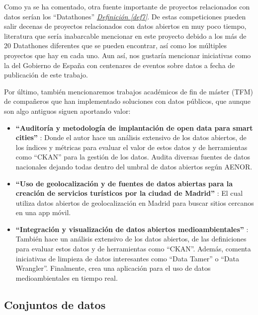 Como ya se ha comentado, otra fuente importante de proyectos relacionados con datos serían los ``Datathones'' \hyperref[def7]{\textit{Definición \ref*{def7}}}. De estas competiciones pueden salir decenas de proyectos relacionados con datos abiertos en muy poco tiempo, literatura que sería inabarcable mencionar en este proyecto debido a los más de 20 Datathones diferentes que se pueden encontrar, así como los múltiples proyectos que hay en cada uno. Aun así, nos gustaría mencionar iniciativas como la del Gobierno de España \citep{EventosDatosAbiertosGOB, EventosDatathonGOB} con centenares de eventos sobre datos a fecha de publicación de este trabajo.

Por último, también mencionaremos trabajos académicos de fin de máster (TFM) de compañeros que han implementado soluciones con datos públicos, que aunque son algo antiguos siguen aportando valor:

\begin{itemize}
	\item \textbf{``Auditoría y metodología de implantación de open data para smart cities''} \citep{MelendrezMoreto2016Auditoria}: Donde el autor hace un análisis extensivo de los datos abiertos, de los índices y métricas para evaluar el valor de estos datos y de herramientas como ``CKAN'' para la gestión de los datos. Audita diversas fuentes de datos nacionales dejando todas dentro del umbral de datos abiertos según AENOR. 
	
	\item \textbf{``Uso de geolocalización y de fuentes de datos abiertas para la creación de servicios turísticos por la ciudad de Madrid''} \citep{ArellanoBruno2019UsoDeGeolocalizacion}: El cual utiliza datos abiertos de geolocalización en Madrid para buscar sitios cercanos en una app móvil.
	
	\item \textbf{``Integración y visualización de datos abiertos medioambientales''} \citep{LLamoccaPortela2016Integracion}: También hace un análisis extensivo de los datos abiertos, de las definiciones para evaluar estos datos y de herramientas como ``CKAN''. Además, comenta iniciativas de limpieza de datos interesantes como ``Data Tamer'' o ``Data Wrangler''. Finalmente, crea una aplicación para el uso de datos medioambientales en tiempo real. \\
\end{itemize} 


\subsection{Conjuntos de datos}

